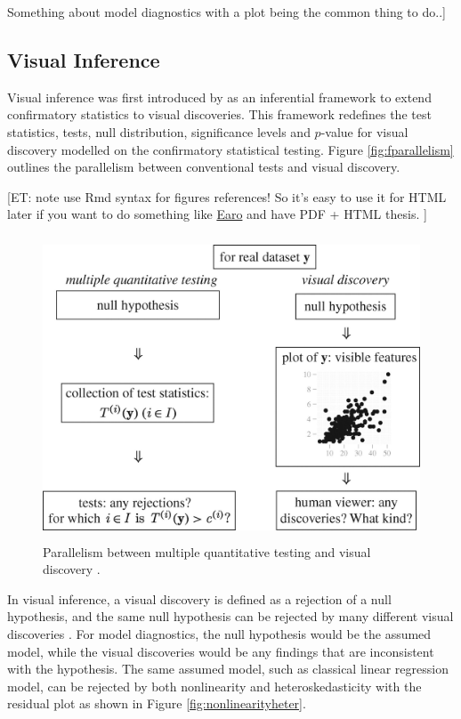 \documentclass{monashthesis}
\begin{document}
Something about model diagnostics with a plot being the common thing to do..{]}

\hypertarget{visual-inference-1}{%
\subsection{Visual Inference}\label{visual-inference-1}}

Visual inference was first introduced by \textcite{buja_statistical_2009} as an inferential framework to extend confirmatory statistics to visual discoveries. This framework redefines the test statistics, tests, null distribution, significance levels and \(p\)-value for visual discovery modelled on the confirmatory statistical testing. Figure \ref{fig:fparallelism} outlines the parallelism between conventional tests and visual discovery.

{[}ET: note use Rmd syntax for figures references! So it's easy to use it for HTML later if you want to do something like \href{https://github.com/earowang/thesis}{Earo} and have PDF + HTML thesis. {]}

\begin{figure}
\centering
\includegraphics[width=4.6875in,height=3.55208in]{figures/rsta2009012001.jpg}
\caption{Parallelism between multiple quantitative testing and visual discovery \autocite{buja_statistical_2009}. \label{fig:parallelism}}
\end{figure}



In visual inference, a visual discovery is defined as a rejection of a null hypothesis, and the same null hypothesis can be rejected by many different visual discoveries \autocite{buja_statistical_2009}. For model diagnostics, the null hypothesis would be the assumed model, while the visual discoveries would be any findings that are inconsistent with the hypothesis. The same assumed model, such as classical linear regression model, can be rejected by both nonlinearity and heteroskedasticity with the residual plot as shown in Figure \ref{fig:nonlinearityheter}.
\end{document}
